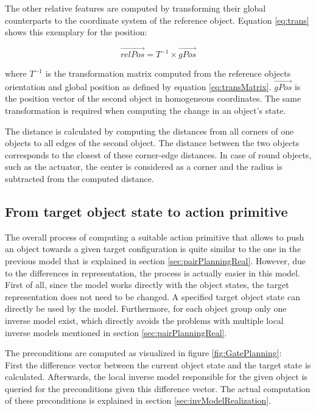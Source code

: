The other relative features are computed by transforming their global counterparts to the coordinate system of the reference object. Equation \ref{eq:trans} shows this exemplary for the position:

\begin{equation}
	\vec{relPos} = T^{-1} \times \vec{gPos}
\label{eq:trans}
\end{equation}

where $T^{-1}$ is the transformation matrix computed from the reference objects orientation and global position as defined by equation \ref{eq:transMatrix}. $\vec{gPos}$ is the position vector of the second object in homogeneous coordinates. The same transformation is required when computing the change in an object's state. 

The distance is calculated by computing the distances from all corners of one objects to all edges of the second object. 
The distance between the two objects corresponds to the closest of these corner-edge distances. In case of round objects, such as the actuator, the center is considered as a corner and the radius is subtracted from the computed distance.


\subsection{From target object state to action primitive \label{sec:gatePlanningReal}}

The overall process of computing a suitable action primitive that allows to push an object towards a given target configuration is quite similar to the one in the previous model that is explained in section \ref{sec:pairPlanningReal}. However, due to the differences in representation, the process is actually easier in this model. 
First of all, since the model works directly with the object states, the target representation does not need to be changed. A specified target object state can directly be used by the model. 
Furthermore, for each object group only one inverse model exist, which directly avoids the problems with multiple local inverse models mentioned in section \ref{sec:pairPlanningReal}. 

The preconditions are computed as visualized in figure \ref{fig:GatePlanning}: \\
First the difference vector between the current object state and the target state is calculated. Afterwards, the local inverse model responsible for the given object is queried for the preconditions given this difference vector. The actual computation of these preconditions is explained in section \ref{sec:invModelRealization}.

